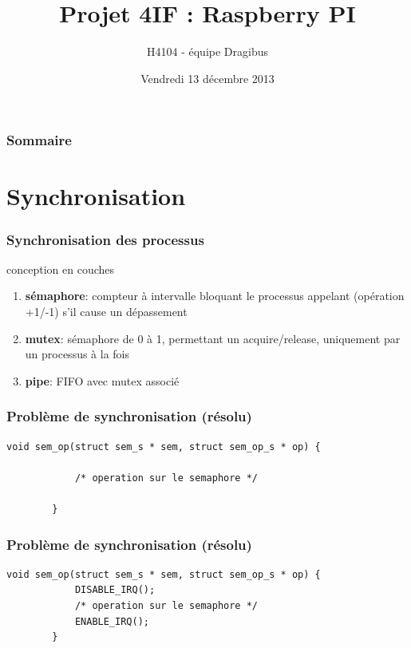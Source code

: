 \documentclass{beamer}
\title[Presentation SEA]{Projet 4IF : Raspberry PI}
\author{H4104 - équipe Dragibus}
\institute{INSA de Lyon}
\date{Vendredi 13 décembre 2013}
\begin{document}
\begin{frame}
    \titlepage
\end{frame}

\begin{frame}
    \frametitle{Sommaire}
    \tableofcontents
\end{frame}

\section{Synchronisation}

\begin{frame}
    \frametitle{Synchronisation des processus}

    \begin{center}
        \huge conception en couches
    \end{center}

    \begin{enumerate}
        \item<2-> \textbf{sémaphore}: compteur à intervalle bloquant le
            processus appelant (opération +1/-1) s'il cause un dépassement
        \item<3-> \textbf{mutex}: sémaphore de 0 à 1, permettant un
            acquire/release, uniquement par un processus à la fois
        \item<4-> \textbf{pipe}: FIFO avec mutex associé
    \end{enumerate}
\end{frame}

\begin{frame}[fragile]
    \frametitle{Problème de synchronisation (résolu)}

    \begin{lstlisting}[caption=Opération sur un sémaphore]
        void sem_op(struct sem_s * sem, struct sem_op_s * op) {

            /* operation sur le semaphore */

        }
    \end{lstlisting}
\end{frame}

\begin{frame}[fragile]
    \frametitle{Problème de synchronisation (résolu)}

    \begin{lstlisting}[caption=Opération {\bfseries atomique} sur un sémaphore]
        void sem_op(struct sem_s * sem, struct sem_op_s * op) {
            DISABLE_IRQ();
            /* operation sur le semaphore */
            ENABLE_IRQ();
        }
    \end{lstlisting}
\end{frame}
\end{document}
